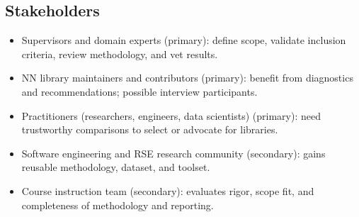 \documentclass{article}
\begin{document}

\subsection{Stakeholders}
\begin{itemize}
  \item Supervisors and domain experts (primary): define scope, validate inclusion criteria,
  review methodology, and vet results.
  \item NN library maintainers and contributors (primary): benefit from diagnostics
  and recommendations; possible interview participants.
  \item Practitioners (researchers, engineers, data scientists) (primary): need trustworthy
  comparisons to select or advocate for libraries.
  \item Software engineering and RSE research community (secondary): gains reusable
  methodology, dataset, and toolset.
  \item Course instruction team (secondary): evaluates rigor, scope fit, and completeness
  of methodology and reporting.
\end{itemize}
\end{document}

